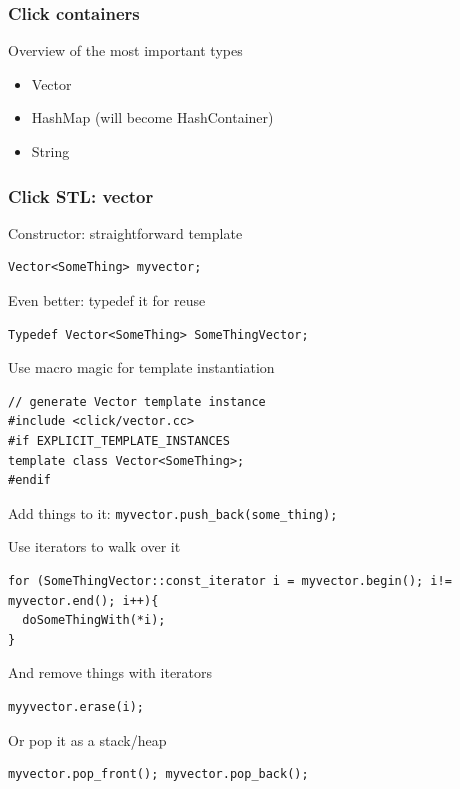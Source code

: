 \documentclass{beamer}
\begin{document}
\begin{frame}
\frametitle{Click containers}
Overview of the most important types
\begin{itemize}
	\item Vector
	\item HashMap (will become HashContainer)
	\item String
\end{itemize}
\end{frame}

\begin{frame}
\frametitle{Click STL: vector}
Constructor: straightforward template
\begin{lstlisting}
Vector<SomeThing> myvector;
\end{lstlisting}
Even better: typedef it for reuse
\begin{lstlisting}
Typedef Vector<SomeThing> SomeThingVector; 
\end{lstlisting}
Use macro magic for template instantiation
\begin{lstlisting}
// generate Vector template instance
#include <click/vector.cc>
#if EXPLICIT_TEMPLATE_INSTANCES
template class Vector<SomeThing>;
#endif
\end{lstlisting}
Add things to it: \lstinline!myvector.push_back(some_thing);!

Use iterators to walk over it
\begin{lstlisting}[basicstyle=\ttfamily]
for (SomeThingVector::const_iterator i = myvector.begin(); i!= myvector.end(); i++){
  doSomeThingWith(*i);  
}
\end{lstlisting}
And remove things with iterators
\begin{lstlisting}
myyvector.erase(i);
\end{lstlisting}
Or pop it as a stack/heap
\begin{lstlisting}
myvector.pop_front(); myvector.pop_back();
\end{lstlisting}
\end{frame}
\end{document}
